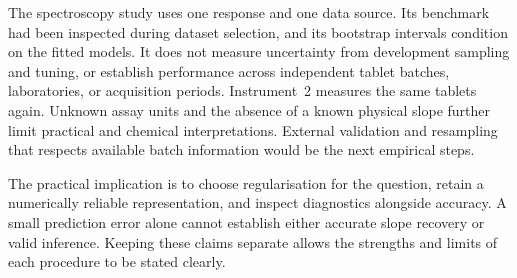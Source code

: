 The spectroscopy study uses one response and one data source. Its benchmark
had been inspected during dataset selection, and its bootstrap intervals
condition on the fitted models. It does not measure uncertainty from
development sampling and tuning, or establish performance across independent
tablet batches, laboratories, or acquisition periods. Instrument~2 measures
the same tablets again. Unknown assay units and the absence of a known
physical slope further limit practical and chemical interpretations.
External validation and resampling that respects available batch information
would be the next empirical steps.

The practical implication is to choose regularisation for the question,
retain a numerically reliable representation, and inspect diagnostics
alongside accuracy. A small prediction error alone cannot establish either
accurate slope recovery or valid inference. Keeping these claims separate
allows the strengths and limits of each procedure to be stated clearly.
